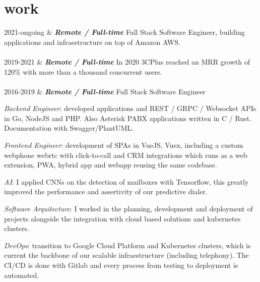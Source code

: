 \documentclass[]{cv-mauri}
\begin{document}
\section*{work}
\begin{tabularcv}
	2021-ongoing   &   
					\textbf{\textit{Remote / Full-time}}
					\newline
			Full Stack Software Engineer, building applications and infraestructure on top of Amazon AWS.
					\\[\vspacepar]
					\\[\vspacepar]
	
    2019-2021   &   
                    \textbf{\textit{Remote / Full-time}}
                    \newline
		    In 2020 3CPlus reached an MRR growth of 120\% with more than a thousand concurrent users.
                    \\[\vspacepar]
                    \\[\vspacepar]
    2016-2019   &   
		    		\textbf{\textit{Remote / Full-time}}
		    		\newline
		    Full Stack Software Engineer
		    
		    \textit{Backend Engineer}: developed applications and REST / GRPC / Websocket APIs in Go, NodeJS and PHP. Also Asterisk PABX applications written in C / Rust. Documentation with Swagger/PlantUML.
		    
		    \textit{Frontend Engineer}: development of SPAs in VueJS, Vuex, including a custom webphone webrtc with click-to-call and CRM integrations which runs as a web extension, PWA, hybrid app and webapp reusing the same codebase.
		    
		    \textit{AI}: I applied CNNs on the detection of mailboxes with Tensorflow, this greatly improved the performance and assertivity of our predictive dialer.
		    
		    \textit{Software Arquitecture}: I worked in the planning, development and deployment of projects alongside the integration with cloud based solutions and kubernetes clusters.
		    
		    \textit{DevOps}: transition to Google Cloud Platform and Kubernetes clusters, which is current the backbone of our scalable infraestructure (including telephony). The CI/CD is done with Gitlab and every process from testing to deployment is automated.


\end{tabularcv}
\end{document}
